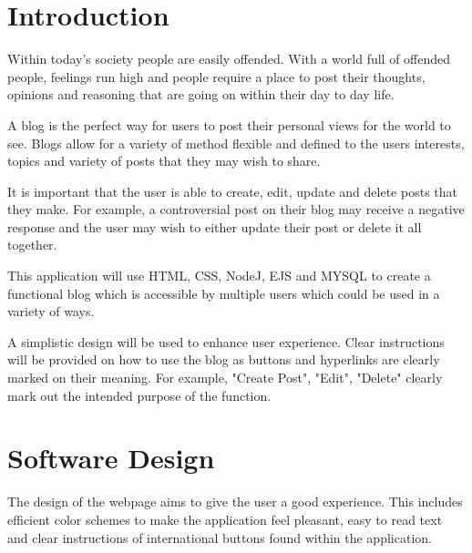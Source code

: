 \documentclass[10pt, a4paper]{article}
\title{\mytitle}
\author{\myauthor\hspace{1em}\\\contact\\Edinburgh Napier University\hspace{0.5em}-\hspace{0.5em}\mymodule}
\date{}
\begin{document}
    
    \section{Introduction}
  Within today's society people are easily offended.  With a world full of offended people, feelings run high and people require a place to post their thoughts, opinions and reasoning that are going on within their day to day life. 

A blog is the perfect way for users to post their personal views for the world to see.  Blogs allow for a variety of method flexible and defined to the users interests, topics and variety of posts
that they may wish to share. 

It is important that the user is able to create, edit, update and delete posts that they make.  For example, a controversial post on their blog may receive a negative response and the user may wish to either update their post or delete it all together. 

This application will use HTML, CSS, NodeJ, EJS and MYSQL  to create a functional blog which is accessible by multiple users which could be used in a variety of ways. 

A simplistic design will be used to enhance user experience.  Clear instructions will be provided on how to use the blog as buttons and hyperlinks are clearly marked on their meaning.  For example, "Create Post", "Edit", "Delete" clearly mark out the intended purpose of the function.
    
	
	\section{Software Design}
	The design of the webpage aims to give the user a good experience.  This includes efficient color schemes to make the application feel pleasant, easy to read text and clear instructions of international  buttons found within the application. 
	
\end{document}
